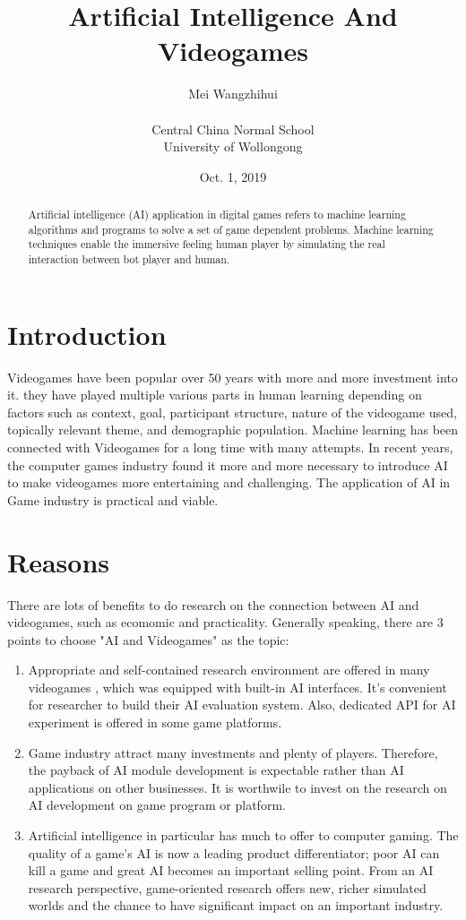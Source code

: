 \documentclass{article}
\title{Artificial Intelligence And Videogames}
\author{ Mei Wangzhihui \\ \\
Central China Normal School\\
University of Wollongong
\\
}
\date{Oct. 1, 2019}
\begin{document}
\maketitle

\begin{abstract}
Artificial intelligence (AI) application in digital games refers to machine learning algorithms and programs to solve a set of game dependent problems. Machine learning techniques enable the immersive feeling human player by simulating the real interaction between bot player and human.\cite{1}
\end{abstract}

\section{Introduction}
Videogames have been popular over 50 years with more and more investment into it. they have played multiple various parts in human learning depending on factors such as context, goal, participant structure, nature of the videogame used, topically relevant theme, and demographic population. \cite{2} Machine learning has been connected with Videogames for a long time with many attempts. \cite{3} In recent years, the computer games industry found it more and more necessary to introduce AI to make videogames more entertaining and challenging. \cite{4,5} The application of AI in Game industry is practical and viable. \cite{6}



\section{Reasons}
There are lots of benefits to do research on the connection between AI and videogames, such as ecomomic and practicality. \cite{7} Generally speaking, there are 3 points to choose "AI and Videogames" as the topic: 
\begin{enumerate}
    \item Appropriate and self-contained research environment are offered in many videogames \cite{8}, which was equipped with built-in AI interfaces. It's convenient for researcher to build their AI evaluation system. Also, dedicated API for AI experiment is offered in some game platforms. \cite{9} 
    \item Game industry attract many investments and plenty of players. Therefore, the payback of AI module development is expectable rather than AI applications on other businesses.\cite{8} It is worthwile to invest on the research on AI development on game program or platform.
    \item Artificial intelligence in particular has much to offer to computer gaming. The quality of a game’s AI is now a leading product differentiator; poor AI can kill a game and great AI becomes an important selling point. From an AI research perspective, game-oriented research offers new, richer simulated worlds and the chance to have significant impact on an important industry. \cite{5}
\end{enumerate}
\end{document}
